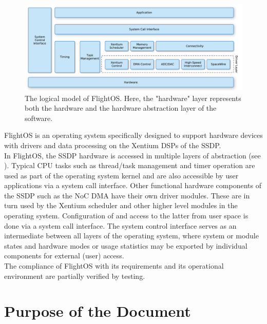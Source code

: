 \begin{figure}[htb]
\begin{center}
	\includegraphics[width=\columnwidth]{../requirements/images/OS_logical}
	\caption{The logical model of FlightOS. Here, the "hardware" layer
	represents both the hardware and the hardware abstraction layer of
	the software.}
	\label{fig:logical_model}
\end{center}
\end{figure}

\noindent
FlightOS\cite{ssdpOS}\cite{flightosADD}\cite{flightosSRS} is an operating system specifically
designed to support hardware devices with drivers and data processing on the
\gls{Xentium} \glspl{DSP} of the \gls{SSDP}.\\

In FlightOS, the \gls{SSDP} hardware is accessed in multiple layers of
abstraction (see ). Typical \gls{CPU} tasks such as
thread/task management and timer operation are used as part of the operating
system kernel and are also accessible by user applications via a system call
interface.  Other functional hardware components of the \gls{SSDP} such as the
\gls{NoC} \gls{DMA} have their own driver modules. These are in turn used by
the \gls{Xentium} scheduler and other higher level modules in the operating
system.  Configuration of and access to the latter from user space is done via
a system call interface. The system control interface serves as an intermediate
between all layers of the operating system, where system or module states and
hardware modes or usage statistics may be exported by individual components for
external (user) access. \\

\noindent
The compliance of FlightOS with its requirements and its operational environment
are partially verified by testing.


\section{Purpose of the Document}

